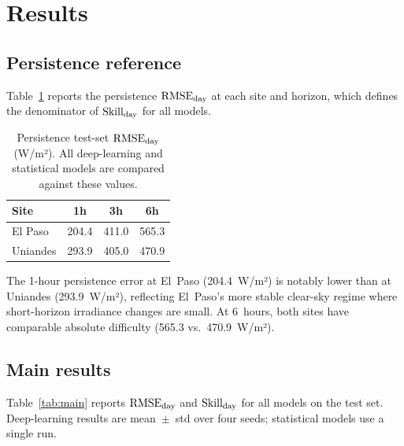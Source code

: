 \section{Results}
\label{sec:results}

\subsection{Persistence reference}

Table~\ref{tab:persistence} reports the persistence $\text{RMSE}_\text{day}$ at each site and
horizon, which defines the denominator of $\text{Skill}_\text{day}$ for all models.

\begin{table}[t]
  \centering
  \caption{Persistence test-set $\text{RMSE}_\text{day}$ (W/m²). All deep-learning and
           statistical models are compared against these values.}
  \label{tab:persistence}
  \begin{tabular}{lccc}
    \toprule
    \textbf{Site} & \textbf{1h} & \textbf{3h} & \textbf{6h} \\
    \midrule
    El Paso   & 204.4 & 411.0 & 565.3 \\
    Uniandes  & 293.9 & 405.0 & 470.9 \\
    \bottomrule
  \end{tabular}
\end{table}

The 1-hour persistence error at El~Paso (204.4~W/m²) is notably lower than at
Uniandes (293.9~W/m²), reflecting El~Paso's more stable clear-sky regime where
short-horizon irradiance changes are small. At 6~hours, both sites have comparable
absolute difficulty (565.3 vs.\ 470.9~W/m²).

\subsection{Main results}

Table~\ref{tab:main} reports $\text{RMSE}_\text{day}$ and $\text{Skill}_\text{day}$ for all models on the
test set. Deep-learning results are mean~$\pm$~std over four seeds; statistical
models use a single run.

